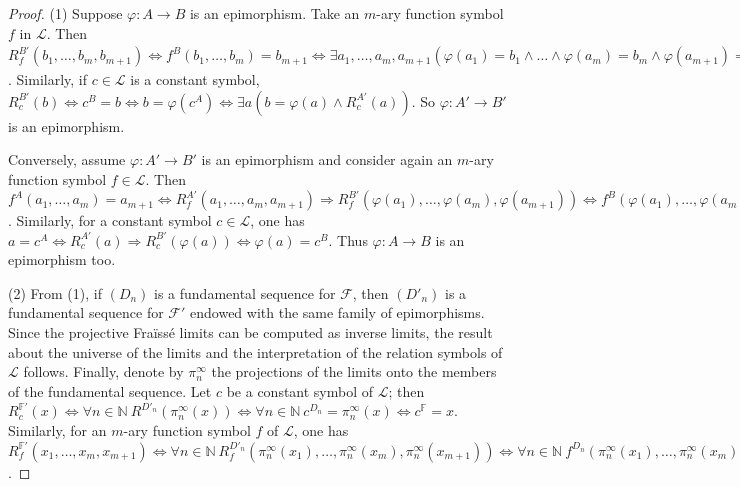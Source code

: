 \documentclass[12pt,twoside,a4paper]{amsart}
\theoremstyle{plain}
\theoremstyle{definition}
\begin{document}
\begin{proof}
\sloppypar
(1) Suppose $ {\varphi} :A\to B$ is an epimorphism.
Take an $m$-ary function symbol $f$ in $ \mathcal L $.
Then $R_f^{B'}(b_1,\ldots ,b_m,b_{m+1})\Leftrightarrow f^B(b_1,\ldots ,b_m)=b_{m+1}\Leftrightarrow\exists a_1,\ldots ,a_m,a_{m+1}( {\varphi} (a_1)=b_1\wedge\ldots\wedge {\varphi} (a_m)=b_m\wedge {\varphi} (a_{m+1})=b_{m+1}\wedge f^A(a_1,\ldots ,a_m)=a_{m+1})\Leftrightarrow\exists a_1,\ldots ,a_{m+1}( {\varphi} (a_1)=b_1\wedge\ldots\wedge {\varphi} (a_{m+1})=b_{m+1}\wedge R_f^{A'}(a_1,\ldots ,a_{m+1}))$.
Similarly, if $c\in \mathcal L $ is a constant symbol, $R_c^{B'}(b)\Leftrightarrow c^B=b\Leftrightarrow b= {\varphi} (c^A)\Leftrightarrow\exists a(b= {\varphi} (a)\wedge R_c^{A'}(a))$.
So $ {\varphi} :A'\to B'$ is an epimorphism.

Conversely, assume $ {\varphi} :A'\to B'$ is an epimorphism and consider again an $m$-ary function symbol $f\in \mathcal L $.
Then $f^A(a_1,\ldots ,a_m)=a_{m+1}\Leftrightarrow R_f^{A'}(a_1,\ldots ,a_m,a_{m+1})\Rightarrow R_f^{B'}( {\varphi} (a_1),\ldots , {\varphi} (a_m), {\varphi} (a_{m+1}))\Leftrightarrow f^B( {\varphi} (a_1),\ldots , {\varphi} (a_m))= {\varphi} (a_{m+1})$.
Similarly, for a constant symbol $c\in \mathcal L $, one has $a=c^A\Leftrightarrow R_c^{A'}(a)\Rightarrow R_c^{B'}( {\varphi} (a))\Leftrightarrow {\varphi} (a)=c^B$.
Thus $ {\varphi} :A\to B$ is an epimorphism too.

(2) From (1), if $(D_n)$ is a fundamental sequence for $ \mathcal F $, then $(D'_n)$ is a fundamental sequence for $ \mathcal F'$ endowed with the same family of epimorphisms.
Since the projective Fra\"iss\'e limits can be computed as inverse limits, the result about the universe of the limits and the interpretation of the relation symbols of $ \mathcal L $ follows.
Finally, denote by $\pi_n^{\infty }$ the projections of the limits onto the members of the fundamental sequence.
Let $c$ be a constant symbol of $ \mathcal L $; then $R_c^{ \mathbb F'}(x)\Leftrightarrow\forall n\in {\mathbb N} \ R^{D'_n}(\pi_n^{\infty }(x))\Leftrightarrow\forall n\in{\mathbb N} \ c^{D_n}=\pi_n^{\infty }(x)\Leftrightarrow c^{ \mathbb F }=x$.
Similarly, for an $m$-ary function symbol $f$ of $ \mathcal L $, one has $R_f^{ \mathbb F'}(x_1,\ldots ,x_m,x_{m+1})\Leftrightarrow\forall n\in {\mathbb N} \ R_f^{D'_n}(\pi_n^{\infty }(x_1),\ldots ,\pi_n^{\infty }(x_m),\pi_n^{\infty }(x_{m+1}))\Leftrightarrow\forall n\in {\mathbb N} \ f^{D_n}(\pi_n^{\infty }(x_1),\ldots ,\pi_n^{\infty }(x_m))=\pi_n^{\infty }(x_{m+1})\Leftrightarrow f^{ \mathbb F }(x_1,\ldots ,x_m)=x_{m+1}$.
\end{proof}
\end{document}

